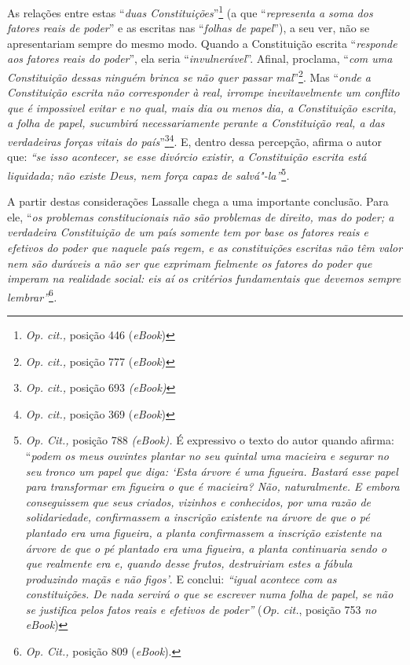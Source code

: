 As relações entre estas ``\emph{duas Constituições}''\footnote{\emph{Op.
  cit.,} posição 446 (\emph{eBook})} (a que ``\emph{representa a soma
dos fatores reais de poder}'' e as escritas nas ``\emph{folhas de
papel}''), a seu ver, não se apresentariam sempre do mesmo modo. Quando
a Constituição escrita ``\emph{responde aos fatores reais do poder}'',
ela seria ``\emph{invulnerável}''. Afinal, proclama, ``\emph{com uma
Constituição dessas ninguém brinca se não quer passar mal}''\footnote{\emph{Op.
  cit.,} posição 777 (\emph{eBook})}. Mas ``\emph{onde a Constituição
escrita não corresponder à real, irrompe inevitavelmente um conflito que
é impossivel evitar e no qual, mais dia ou menos dia, a Constituição
escrita, a folha de papel, sucumbirá necessariamente perante a
Constituição real, a das verdadeiras forças vitais do país}''\footnote{\emph{Op.
  cit.,} posição 693 \emph{(eBook)}}\footnote{\emph{Op. cit.,} posição
  369 (\emph{eBook})}. E, dentro dessa percepção, afirma o autor que:
\emph{``se isso acontecer, se esse divórcio existir, a Constituição
escrita está liquidada; não existe Deus, nem força capaz de
salvá"-la''}\footnote{\emph{Op. Cit.,} posição 788 \emph{(eBook).} É
  expressivo o texto do autor quando afirma: ``\emph{podem os meus
  ouvintes plantar no seu quintal uma macieira e segurar no seu tronco
  um papel que diga: `Esta árvore é uma figueira. Bastará esse papel
  para transformar em figueira o que é macieira? Não, naturalmente. E
  embora conseguissem que seus criados, vizinhos e conhecidos, por uma
  razão de solidariedade, confirmassem a inscrição existente na árvore
  de que o pé plantado era uma figueira, a planta confirmassem a
  inscrição existente na árvore de que o pé plantado era uma figueira, a
  planta continuaria sendo o que realmente era e, quando desse frutos,
  destruiriam estes a fábula produzindo maçãs e não figos'}. E conclui:
  \emph{``igual acontece com as constituições. De nada servirá o que se
  escrever numa folha de papel, se não se justifica pelos fatos reais e
  efetivos de poder''} (\emph{Op. cit.}, posição 753 \emph{no eBook})}\emph{.}

A partir destas considerações Lassalle chega a uma importante conclusão.
Para ele, ``\emph{os problemas constitucionais não são problemas de
direito, mas do poder; a verdadeira Constituição de um país somente tem
por base os fatores reais e efetivos do poder que naquele país regem, e
as constituições escritas não têm valor nem são duráveis a não ser que
exprimam fielmente os fatores do poder que imperam na realidade social:
eis aí os critérios fundamentais que devemos sempre lembrar''}\footnote{\emph{Op.
  Cit.,} posição 809 (\emph{eBook}).}\emph{.}

